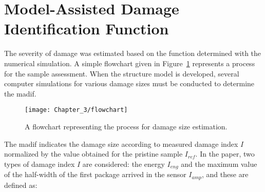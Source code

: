 \section{Model-Assisted Damage Identification Function}
\label{sec:madif}


The severity of damage was estimated based on the function determined with the numerical simulation.
A simple flowchart given in Figure~\ref{fig:Flowchart} represents a process for the sample assessment.
When the structure model is developed, several computer simulations for various damage sizes must be conducted to determine the \ac{madif}.
\begin{figure}[H]
	\texttt{[image: Chapter\_3/flowchart]}
	\caption{A flowchart representing the process for damage size estimation.}
	\label{fig:Flowchart}
\end{figure}
The \ac{madif} indicates the damage size according to measured damage index \(I\) normalized by the value obtained for the pristine sample \(I_{ref}\).
In the paper, two types of damage index \(I\) are considered: the energy \(I_{eng}\) and the maximum value of the half-width of the first package arrived in the sensor \(I_{amp}\), and these are defined as:
